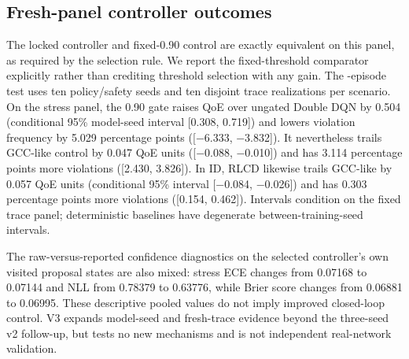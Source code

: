 \documentclass[10pt]{article}
\providecommand{\thresholdpath}{generated-threshold}
\begin{document}
\subsection{Fresh-panel controller outcomes}
The locked controller and fixed-0.90 control are exactly equivalent on this panel, as required by the selection rule. We report the fixed-threshold comparator explicitly rather than crediting threshold selection with any gain. The \ThresholdNumEpisodes{}-episode test uses ten policy/safety seeds and ten disjoint trace realizations per scenario. On the stress panel, the 0.90 gate raises QoE over ungated Double DQN by 0.504 (conditional 95\% model-seed interval [0.308, 0.719]) and lowers violation frequency by 5.029 percentage points ([−6.333, −3.832]). It nevertheless trails GCC-like control by 0.047 QoE units ([−0.088, −0.010]) and has 3.114 percentage points more violations ([2.430, 3.826]). In ID, RLCD likewise trails GCC-like by 0.057 QoE units (conditional 95\% interval [−0.084, −0.026]) and has 0.303 percentage points more violations ([0.154, 0.462]). Intervals condition on the fixed trace panel; deterministic baselines have degenerate between-training-seed intervals.

\begin{table}[t]
\centering\resizebox{\textwidth}{!}{}
\caption{V3 fresh-test outcomes on disjoint realizations of the validation scenario families. Entries are means and conditional 95\% training-seed bootstrap intervals. ``RLCD'' is the validation-selected threshold; it equals the separately evaluated 0.90 reference exactly, so the duplicate rows are intentional. Unsafe and fallback are episode percentages.}
\label{tab:threshold-test}
\end{table}

\begin{table}[t]
\centering\resizebox{\textwidth}{!}{}
\caption{V3 paired RLCD-minus-reference contrasts on the fresh trace panel. Violation differences are percentage points; intervals resample the ten model seeds conditional on this panel.}
\label{tab:threshold-contrasts}
\end{table}

The raw-versus-reported confidence diagnostics on the selected controller's own visited proposal states are also mixed: stress ECE changes from 0.07168 to 0.07144 and NLL from 0.78379 to 0.63776, while Brier score changes from 0.06881 to 0.06995. These descriptive pooled values do not imply improved closed-loop control. V3 expands model-seed and fresh-trace evidence beyond the three-seed v2 follow-up, but tests no new mechanisms and is not independent real-network validation.
\end{document}
